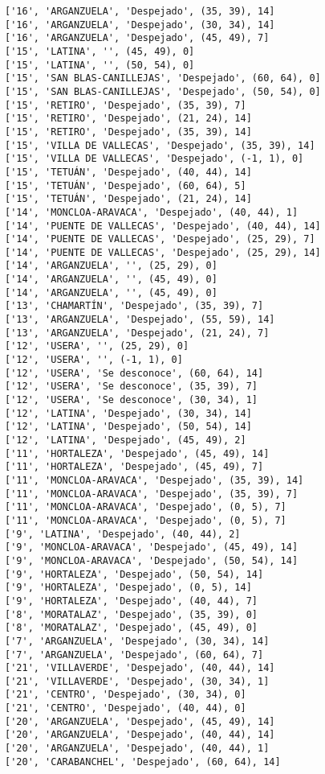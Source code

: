 \documentclass[11pt]{article}
\begin{document}
\begin{Verbatim}[commandchars=\\\{\}]
['16', 'ARGANZUELA', 'Despejado', (35, 39), 14]
['16', 'ARGANZUELA', 'Despejado', (30, 34), 14]
['16', 'ARGANZUELA', 'Despejado', (45, 49), 7]
['15', 'LATINA', '', (45, 49), 0]
['15', 'LATINA', '', (50, 54), 0]
['15', 'SAN BLAS-CANILLEJAS', 'Despejado', (60, 64), 0]
['15', 'SAN BLAS-CANILLEJAS', 'Despejado', (50, 54), 0]
['15', 'RETIRO', 'Despejado', (35, 39), 7]
['15', 'RETIRO', 'Despejado', (21, 24), 14]
['15', 'RETIRO', 'Despejado', (35, 39), 14]
['15', 'VILLA DE VALLECAS', 'Despejado', (35, 39), 14]
['15', 'VILLA DE VALLECAS', 'Despejado', (-1, 1), 0]
['15', 'TETUÁN', 'Despejado', (40, 44), 14]
['15', 'TETUÁN', 'Despejado', (60, 64), 5]
['15', 'TETUÁN', 'Despejado', (21, 24), 14]
['14', 'MONCLOA-ARAVACA', 'Despejado', (40, 44), 1]
['14', 'PUENTE DE VALLECAS', 'Despejado', (40, 44), 14]
['14', 'PUENTE DE VALLECAS', 'Despejado', (25, 29), 7]
['14', 'PUENTE DE VALLECAS', 'Despejado', (25, 29), 14]
['14', 'ARGANZUELA', '', (25, 29), 0]
['14', 'ARGANZUELA', '', (45, 49), 0]
['14', 'ARGANZUELA', '', (45, 49), 0]
['13', 'CHAMARTÍN', 'Despejado', (35, 39), 7]
['13', 'ARGANZUELA', 'Despejado', (55, 59), 14]
['13', 'ARGANZUELA', 'Despejado', (21, 24), 7]
['12', 'USERA', '', (25, 29), 0]
['12', 'USERA', '', (-1, 1), 0]
['12', 'USERA', 'Se desconoce', (60, 64), 14]
['12', 'USERA', 'Se desconoce', (35, 39), 7]
['12', 'USERA', 'Se desconoce', (30, 34), 1]
['12', 'LATINA', 'Despejado', (30, 34), 14]
['12', 'LATINA', 'Despejado', (50, 54), 14]
['12', 'LATINA', 'Despejado', (45, 49), 2]
['11', 'HORTALEZA', 'Despejado', (45, 49), 14]
['11', 'HORTALEZA', 'Despejado', (45, 49), 7]
['11', 'MONCLOA-ARAVACA', 'Despejado', (35, 39), 14]
['11', 'MONCLOA-ARAVACA', 'Despejado', (35, 39), 7]
['11', 'MONCLOA-ARAVACA', 'Despejado', (0, 5), 7]
['11', 'MONCLOA-ARAVACA', 'Despejado', (0, 5), 7]
['9', 'LATINA', 'Despejado', (40, 44), 2]
['9', 'MONCLOA-ARAVACA', 'Despejado', (45, 49), 14]
['9', 'MONCLOA-ARAVACA', 'Despejado', (50, 54), 14]
['9', 'HORTALEZA', 'Despejado', (50, 54), 14]
['9', 'HORTALEZA', 'Despejado', (0, 5), 14]
['9', 'HORTALEZA', 'Despejado', (40, 44), 7]
['8', 'MORATALAZ', 'Despejado', (35, 39), 0]
['8', 'MORATALAZ', 'Despejado', (45, 49), 0]
['7', 'ARGANZUELA', 'Despejado', (30, 34), 14]
['7', 'ARGANZUELA', 'Despejado', (60, 64), 7]
['21', 'VILLAVERDE', 'Despejado', (40, 44), 14]
['21', 'VILLAVERDE', 'Despejado', (30, 34), 1]
['21', 'CENTRO', 'Despejado', (30, 34), 0]
['21', 'CENTRO', 'Despejado', (40, 44), 0]
['20', 'ARGANZUELA', 'Despejado', (45, 49), 14]
['20', 'ARGANZUELA', 'Despejado', (40, 44), 14]
['20', 'ARGANZUELA', 'Despejado', (40, 44), 1]
['20', 'CARABANCHEL', 'Despejado', (60, 64), 14]

\end{Verbatim}
\end{document}
